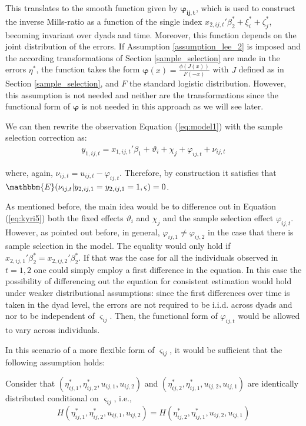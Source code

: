 This translates to the smooth function given by $\bm{\varphi_{ij,t}}$, which is used to construct the inverse Mills-ratio as a function of the single index $x_{2,ij,t}'{\beta_2^*}  +\xi_{i}^*+\zeta_{j}^*$, becoming invariant over dyads and time. Moreover, this function depends on the joint distribution of the errors. If Assumption \ref{assumption_lee_2} is imposed and the according transformations of Section \ref{sample_selection} are made in the errors $\eta^*$, the function takes the form $\bm{\varphi}(x) = \frac{\phi(J(x))}{F(-x)}$ with $J$ defined as in Section \ref{sample_selection}, and $F$ the standard logistic distribution. However, this assumption is not needed and neither are the transformations since the functional form of $\bm{\varphi}$ is not needed in this approach as we will see later. 

We can then rewrite the observation Equation (\ref{eq:model1}) with the sample selection correction as:
\begin{align} \label{eq:kyri5}
    y_{1,ij,t} = x_{1,ij,t}'\beta_1 + \vartheta_i + \chi_j + \varphi_{ij,t} + \nu_{ij,t}
\end{align}

\noindent where, again, $\nu_{ij,t} = u_{ij,t} - \varphi_{ij,t}$. Therefore, by construction it satisfies that $\mathbbm{E}(\nu_{ij,t} \rvert y_{2,ij,1} = y_{2,ij,1} = 1, \varsigma) = 0$.

As mentioned before, the main idea would be to difference out in Equation (\ref{eq:kyri5}) both the fixed effects $\vartheta_i$ and $\chi_j$ and the sample selection effect $\varphi_{ij,t}$. However, as pointed out before, in general, $\varphi_{ij,1} \neq \varphi_{ij,2}$ in the case that there is sample selection in the model. The equality would only hold if $x_{2,ij,1}'{\beta_2^*} = x_{2,ij,2}'{\beta_2^*}$. If that was the case for all the individuals observed in $t=1,2$ one could simply employ a first difference in the equation. In this case the possibility of differencing out the equation for consistent estimation would hold under weaker distributional assumptions: since the first differences over time is taken in the dyad level, the errors are not required to be i.i.d. across dyads and nor to be independent of $\varsigma_{ij}$. Then, the functional form of $\varphi_{ij,t}$ would be allowed to vary across individuals.

In this scenario of a more flexible form of $\varsigma_{ij}$, it would be sufficient that the following assumption holds:
\begin{assumption} \label{conditional_exch}
    Consider that $(\eta^*_{ij,1}, \eta^*_{ij,2}, u_{ij,1},u_{ij,2})$ and $(\eta^*_{ij,2}, \eta^*_{ij,1}, u_{ij,2},u_{ij,1})$ are identically distributed conditional on $\varsigma_{ij}$, i.e.,
    $$ H(\eta^*_{ij,1}, \eta^*_{ij,2}, u_{ij,1},u_{ij,2}) = H(\eta^*_{ij,2}, \eta^*_{ij,1}, u_{ij,2},u_{ij,1})$$
\end{assumption}

